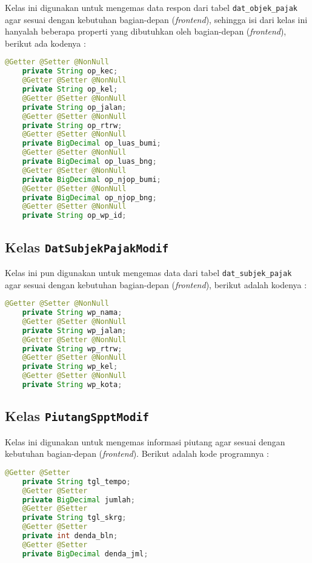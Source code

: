 \documentclass[pdftex,12pt, oneside]{article}
\begin{document}
Kelas ini digunakan untuk mengemas data respon dari tabel \texttt{dat\_objek\_pajak} agar sesuai dengan kebutuhan bagian-depan (\textit{frontend}), sehingga isi dari kelas ini hanyalah beberapa properti yang dibutuhkan oleh bagian-depan (\textit{frontend}), berikut ada kodenya :

\begin{lstlisting}[language=java]
    @Getter @Setter @NonNull
    private String op_kec;
    @Getter @Setter @NonNull
    private String op_kel;
    @Getter @Setter @NonNull
    private String op_jalan;
    @Getter @Setter @NonNull
    private String op_rtrw;
    @Getter @Setter @NonNull
    private BigDecimal op_luas_bumi;
    @Getter @Setter @NonNull
    private BigDecimal op_luas_bng;
    @Getter @Setter @NonNull
    private BigDecimal op_njop_bumi;
    @Getter @Setter @NonNull
    private BigDecimal op_njop_bng;
    @Getter @Setter @NonNull
    private String op_wp_id;
\end{lstlisting}

\subsection{Kelas \texttt{DatSubjekPajakModif}}

Kelas ini pun digunakan untuk mengemas data dari tabel \texttt{dat\_subjek\_pajak} agar sesuai dengan kebutuhan bagian-depan (\textit{frontend}), berikut adalah kodenya :

\begin{lstlisting}[language=java]
    @Getter @Setter @NonNull
    private String wp_nama;
    @Getter @Setter @NonNull
    private String wp_jalan;
    @Getter @Setter @NonNull
    private String wp_rtrw;
    @Getter @Setter @NonNull
    private String wp_kel;
    @Getter @Setter @NonNull
    private String wp_kota;
\end{lstlisting}

\subsection{Kelas \texttt{PiutangSpptModif}}

Kelas ini digunakan untuk mengemas informasi piutang agar sesuai dengan kebutuhan bagian-depan (\textit{frontend}). Berikut adalah kode programnya :

\begin{lstlisting}[language=java]
    @Getter @Setter
    private String tgl_tempo;
    @Getter @Setter
    private BigDecimal jumlah;
    @Getter @Setter
    private String tgl_skrg;
    @Getter @Setter
    private int denda_bln;
    @Getter @Setter
    private BigDecimal denda_jml;
\end{lstlisting}
\end{document}

